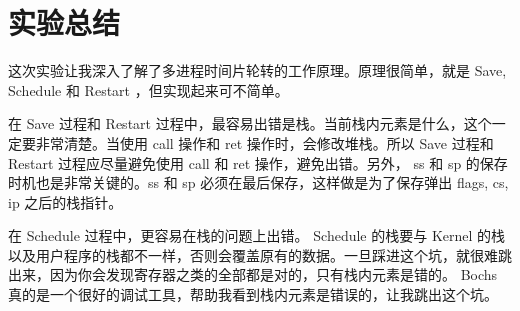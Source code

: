 \documentclass{article}
\begin{document}
\section{实验总结}

这次实验让我深入了解了多进程时间片轮转的工作原理。原理很简单，就是 Save, Schedule 和 Restart ，但实现起来可不简单。

在 Save 过程和 Restart 过程中，最容易出错是栈。当前栈内元素是什么，这个一定要非常清楚。当使用 call 操作和 ret 操作时，会修改堆栈。所以 Save 过程和 Restart 过程应尽量避免使用 call 和 ret 操作，避免出错。另外， ss 和 sp 的保存时机也是非常关键的。ss 和 sp 必须在最后保存，这样做是为了保存弹出 flags, cs, ip 之后的栈指针。

在 Schedule 过程中，更容易在栈的问题上出错。 Schedule 的栈要与 Kernel 的栈以及用户程序的栈都不一样，否则会覆盖原有的数据。一旦踩进这个坑，就很难跳出来，因为你会发现寄存器之类的全部都是对的，只有栈内元素是错的。 Bochs 真的是一个很好的调试工具，帮助我看到栈内元素是错误的，让我跳出这个坑。
\end{document}
